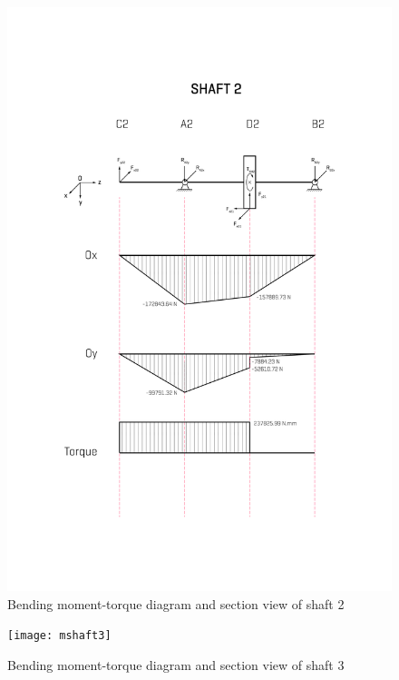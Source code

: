 \begin{figure}[ht]
	\centering
	\includegraphics[width=\linewidth]{mshaft2}
	\caption{Bending moment-torque diagram and section view of shaft 2}
	\label{mshaft2}
\end{figure}

\begin{figure}[ht]
	\centering
	\texttt{[image: mshaft3]}
	\caption{Bending moment-torque diagram and section view of shaft 3}
	\label{mshaft3}
\end{figure}

